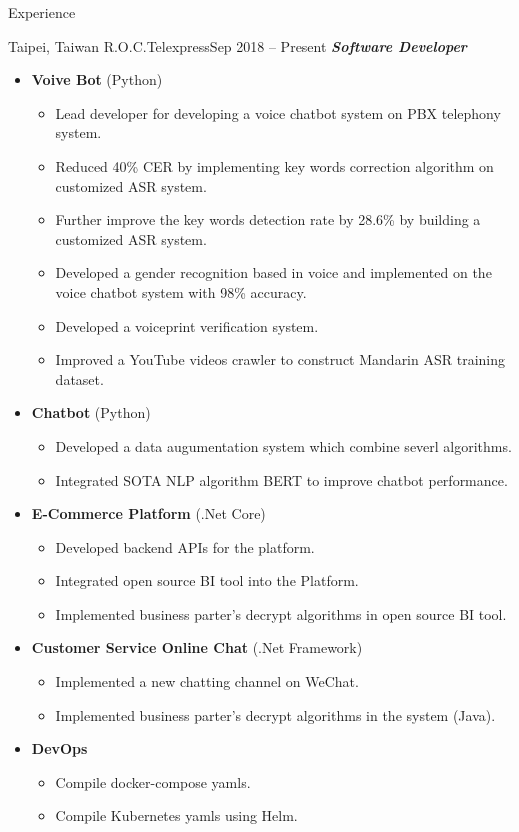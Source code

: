 \documentclass[]{mcdowellcv}
\begin{document}
\makeheader
      

\begin{cvsection}{Experience}
	\begin{cvsubsection}{Taipei, Taiwan R.O.C.}{Telexpress}{Sep 2018 -- Present}
		\textbf{\textsl{Software Developer}}
		\begin{itemize}
			\item \textbf{Voive Bot} (Python)
				\begin{itemize}%
					\item Lead developer for developing a voice chatbot system on PBX telephony system.
					\item Reduced 40\% CER by implementing key words correction algorithm on customized ASR system.
					\item Further improve the key words detection rate by 28.6\% by building a customized ASR system.
					\item Developed a gender recognition based in voice and implemented on the voice chatbot system with 98\% accuracy.
					\item Developed a voiceprint verification system.
					\item Improved a YouTube videos crawler to construct Mandarin ASR training dataset.
				\end{itemize}
			\item \textbf{Chatbot} (Python)
				\begin{itemize}%
					\item Developed a data augumentation system which combine severl algorithms.
					\item Integrated SOTA NLP algorithm BERT to improve chatbot performance.
				\end{itemize}
			\item \textbf{E-Commerce Platform} (.Net Core)						
				\begin{itemize}%
					\item Developed backend APIs for the platform.
					\item Integrated open source BI tool into the Platform.
					\item Implemented business parter's decrypt algorithms in open source BI tool.
				\end{itemize}
			\item \textbf{Customer Service Online Chat} (.Net Framework)	
				\begin{itemize}%
					\item Implemented a new chatting channel on WeChat.
					\item Implemented business parter's decrypt algorithms in the system (Java).
				\end{itemize}
			\item \textbf{DevOps}
				\begin{itemize}%
					\item Compile docker-compose yamls.
					\item Compile Kubernetes yamls using Helm.
				\end{itemize}
		\end{itemize}
	\end{cvsubsection}
\end{cvsection}
\end{document}
